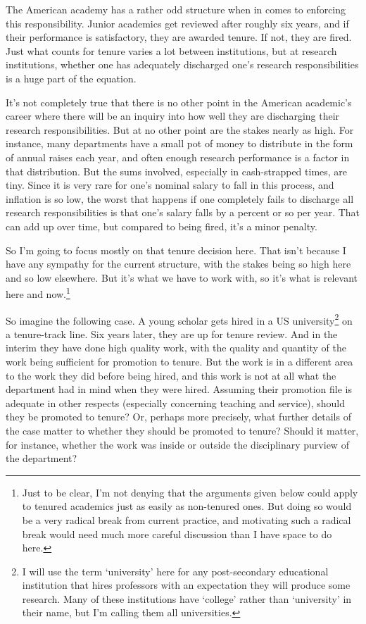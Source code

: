 \documentclass[
  11pt,
  letterpaper,
  DIV=11,
  numbers=noendperiod]{scrartcl}
\begin{document}
The American academy has a rather odd structure when in comes to
enforcing this responsibility. Junior academics get reviewed after
roughly six years, and if their performance is satisfactory, they are
awarded tenure. If not, they are fired. Just what counts for tenure
varies a lot between institutions, but at research institutions, whether
one has adequately discharged one's research responsibilities is a huge
part of the equation.

It's not completely true that there is no other point in the American
academic's career where there will be an inquiry into how well they are
discharging their research responsibilities. But at no other point are
the stakes nearly as high. For instance, many departments have a small
pot of money to distribute in the form of annual raises each year, and
often enough research performance is a factor in that distribution. But
the sums involved, especially in cash-strapped times, are tiny. Since it
is very rare for one's nominal salary to fall in this process, and
inflation is so low, the worst that happens if one completely fails to
discharge all research responsibilities is that one's salary falls by a
percent or so per year. That can add up over time, but compared to being
fired, it's a minor penalty.

So I'm going to focus mostly on that tenure decision here. That isn't
because I have any sympathy for the current structure, with the stakes
being so high here and so low elsewhere. But it's what we have to work
with, so it's what is relevant here and now.\footnote{Just to be clear,
  I'm not denying that the arguments given below could apply to tenured
  academics just as easily as non-tenured ones. But doing so would be a
  very radical break from current practice, and motivating such a
  radical break would need much more careful discussion than I have
  space to do here.}

So imagine the following case. A young scholar gets hired in a US
university\footnote{I will use the term `university' here for any
  post-secondary educational institution that hires professors with an
  expectation they will produce some research. Many of these
  institutions have `college' rather than `university' in their name,
  but I'm calling them all universities.} on a tenure-track line. Six
years later, they are up for tenure review. And in the interim they have
done high quality work, with the quality and quantity of the work being
sufficient for promotion to tenure. But the work is in a different area
to the work they did before being hired, and this work is not at all
what the department had in mind when they were hired. Assuming their
promotion file is adequate in other respects (especially concerning
teaching and service), should they be promoted to tenure? Or, perhaps
more precisely, what further details of the case matter to whether they
should be promoted to tenure? Should it matter, for instance, whether
the work was inside or outside the disciplinary purview of the
department?
\end{document}
